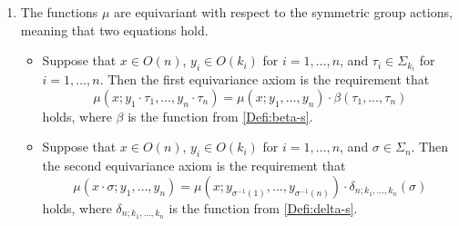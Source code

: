 \begin{Defi}
\begin{enumerate}
  \[
    \xy
      (0,0)*+{\scriptstyle O(n) \times \left(\prod_{i=1}^n O(k_i)\right) \times \left(\prod_{i=1}^n\prod_{j=1}^{k_i} O(l_{i,j})\right)}="a";
      (65,0)*+{\scriptstyle O(n) \times \prod_{i=1}^n \left(O(k_i) \times \prod_{j=1}^{k_i} O(l_{i,j})\right)}="b";
      (65,-20)*+{\scriptstyle O(n) \times \prod_{i=1}^n O\left(\sum_{j=1}^{k_i} l_{i,j}\right)}="c";
      (65,-40)*+{\scriptstyle O\left(\sum_{i=1}^n \sum_{j=1}^{k_i} l_{i,j}\right)}="d";
      (0,-40)*+{\scriptstyle O\left(\sum_{i=1}^n k_i\right) \times \prod_{i=1}^n \prod_{j=1}^{k_i} O(l_{i,j})}="e";
      {\ar^{\cong} "a" ; "b"};
      {\ar^{1 \times \prod \mu} "b" ; "c"};
      {\ar^{\mu} "c" ; "d"};
      {\ar_{\mu \times 1} "a" ; "e"};
      {\ar_{\mu} "e" ; "d"};
    \endxy
  \]

\item The functions $\mu$ are equivariant with respect to the symmetric group actions, meaning that two equations hold.
\begin{itemize}
\item[3.1] Suppose that $x \in O(n)$, $y_i \in O(k_i)$ for $i = 1, \ldots, n$, and $\tau_i \in \Sigma_{k_i}$ for  $i = 1, \ldots, n$. Then the first equivariance axiom is the requirement that
\[
\mu(x;y_1 \cdot \tau_1,\ldots,y_n \cdot \tau_n) = \mu(x;y_1,\ldots,y_n)\cdot \beta(\tau_1,\ldots,\tau_n)
\]
holds, where $\beta$ is the function from \cref{Defi:beta-s}.
\end{itemize}
\begin{itemize}
\item[3.2] Suppose that  $x \in O(n)$, $y_i \in O(k_i)$ for $i = 1, \ldots, n$, and $\sigma \in \Sigma_{n}$. 
Then the second equivariance axiom is the requirement that
\[
 \mu(x \cdot \sigma; y_1, \ldots, y_n) = \mu\left(x;y_{\sigma^{-1}(1)},\ldots,y_{\sigma^{-1}(n)}\right)\cdot \delta_{n; k_1, \ldots, k_n}(\sigma)
\]
holds, where $\delta_{n; k_1, \ldots, k_n}$ is the function from \cref{Defi:delta-s}.
\end{itemize}
%
\end{enumerate}
\end{Defi}

